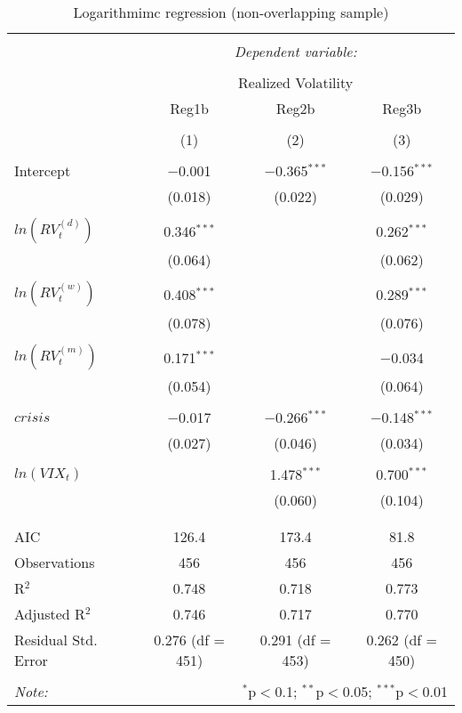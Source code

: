 
\begin{table}[!htbp] \centering 
  \caption{Logarithmimc regression (non-overlapping sample)} 
  \label{tab:overlap2} 
\begin{tabular}{@{\extracolsep{5pt}}lccc} 
\\[-1.8ex]\hline 
\hline \\[-1.8ex] 
 & \multicolumn{3}{c}{\textit{Dependent variable:}} \\ 
\cline{2-4} 
\\[-1.8ex] & \multicolumn{3}{c}{Realized Volatility} \\ 
 & Reg1b & Reg2b & Reg3b \\ 
\\[-1.8ex] & (1) & (2) & (3)\\ 
\hline \\[-1.8ex] 
 Intercept & $-$0.001 & $-$0.365$^{***}$ & $-$0.156$^{***}$ \\ 
  & (0.018) & (0.022) & (0.029) \\ 
  & & & \\ 
 $ln(RV^{(d)}_{t})$ & 0.346$^{***}$ &  & 0.262$^{***}$ \\ 
  & (0.064) &  & (0.062) \\ 
  & & & \\ 
 $ln(RV^{(w)}_{t})$ & 0.408$^{***}$ &  & 0.289$^{***}$ \\ 
  & (0.078) &  & (0.076) \\ 
  & & & \\ 
 $ ln(RV^{(m)}_{t})$ & 0.171$^{***}$ &  & $-$0.034 \\ 
  & (0.054) &  & (0.064) \\ 
  & & & \\ 
 $crisis$ & $-$0.017 & $-$0.266$^{***}$ & $-$0.148$^{***}$ \\ 
  & (0.027) & (0.046) & (0.034) \\ 
  & & & \\ 
 $ln(VIX_{t})$ &  & 1.478$^{***}$ & 0.700$^{***}$ \\ 
  &  & (0.060) & (0.104) \\ 
  & & & \\ 
\hline \\[-1.8ex] 
AIC & 126.4 & 173.4 & 81.8 \\ 
Observations & 456 & 456 & 456 \\ 
R$^{2}$ & 0.748 & 0.718 & 0.773 \\ 
Adjusted R$^{2}$ & 0.746 & 0.717 & 0.770 \\ 
Residual Std. Error & 0.276 (df = 451) & 0.291 (df = 453) & 0.262 (df = 450) \\ 
\hline 
\hline \\[-1.8ex] 
\textit{Note:}  & \multicolumn{3}{r}{$^{*}$p$<$0.1; $^{**}$p$<$0.05; $^{***}$p$<$0.01} \\ 
\end{tabular} 
\end{table} 
